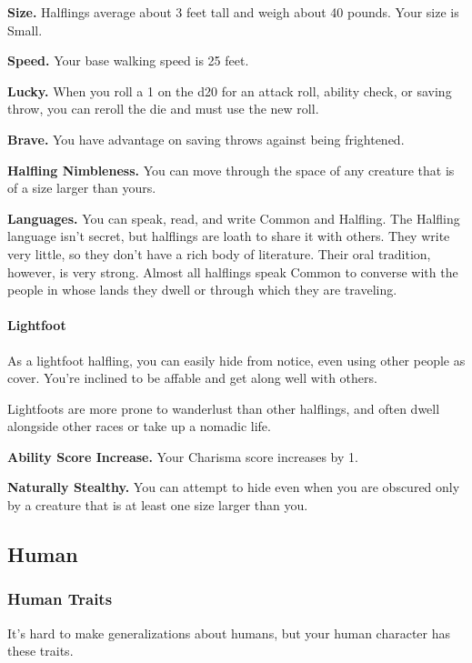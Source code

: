 \documentclass[
]{article}
\begin{document}
\textbf{Size.} Halflings average about 3 feet tall and weigh about 40
pounds. Your size is Small.

\textbf{Speed.} Your base walking speed is 25 feet.

\textbf{Lucky.} When you roll a 1 on the d20 for an attack roll, ability
check, or saving throw, you can reroll the die and must use the new
roll.

\textbf{Brave.} You have advantage on saving throws against being
frightened.

\textbf{Halfling Nimbleness.} You can move through the space of any
creature that is of a size larger than yours.

\textbf{Languages.} You can speak, read, and write Common and Halfling.
The Halfling language isn't secret, but halflings are loath to share it
with others. They write very little, so they don't have a rich body of
literature. Their oral tradition, however, is very strong. Almost all
halflings speak Common to converse with the people in whose lands they
dwell or through which they are traveling.

\hypertarget{lightfoot}{%
\paragraph{Lightfoot}\label{lightfoot}}

As a lightfoot halfling, you can easily hide from notice, even using
other people as cover. You're inclined to be affable and get along well
with others.

Lightfoots are more prone to wanderlust than other halflings, and often
dwell alongside other races or take up a nomadic life.

\textbf{Ability Score Increase.} Your Charisma score increases by 1.

\textbf{Naturally Stealthy.} You can attempt to hide even when you are
obscured only by a creature that is at least one size larger than you.

\hypertarget{human}{%
\subsection{Human}\label{human}}

\hypertarget{human-traits}{%
\subsubsection{Human Traits}\label{human-traits}}

It's hard to make generalizations about humans, but your human character
has these traits.
\end{document}
